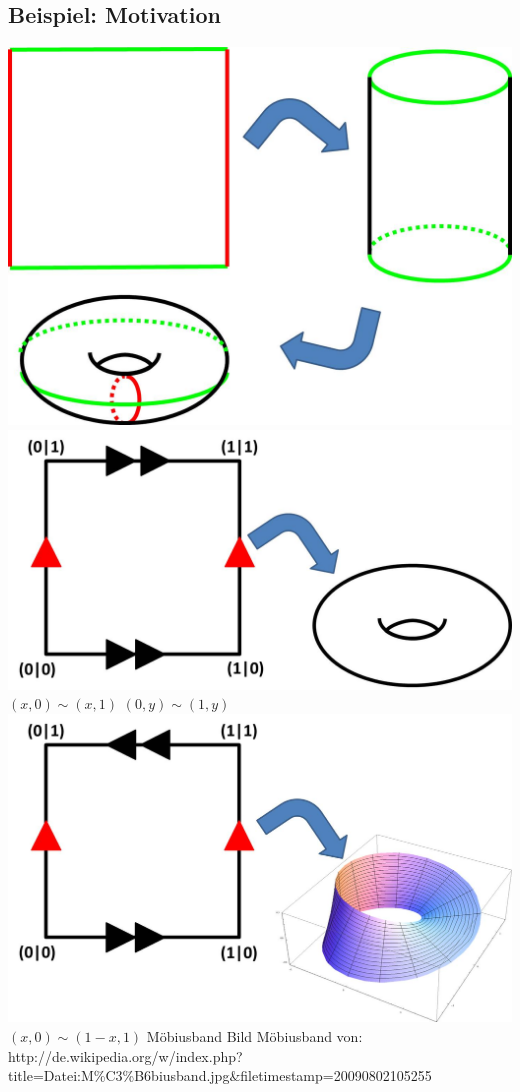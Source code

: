 \documentclass[a4paper,11pt,notitlepage]{report}
\theoremstyle{definition}
\newenvironment{bsp}[1]
{
\setlength{\fboxsep}{10pt}
\subsection*{Beispiel: #1}
\begin{upshape}
}
{
\end{upshape}
}
\begin{document}
\begin{bsp}{Motivation}
	\includegraphics[scale=0.4]{images/Quadrat_nach_Torus.jpg}
	\newline
	\includegraphics[scale=0.4]{images/Quotient_Torus.jpg}\newline
	$(x,0) \sim (x,1)$
	\newline
	$(0,y) \sim (1,y)$
	\newline
	\includegraphics[scale=0.4]{images/Quotient_Moebius.jpg}\newline
	$(x,0) \sim (1-x,1)$
	\newline Möbiusband \newline
	\scriptsize{Bild Möbiusband von:\\ http://de.wikipedia.org/w/index.php?title=Datei:M\%C3\%B6biusband.jpg\&filetimestamp=20090802105255}
\end{bsp}
\end{document}

